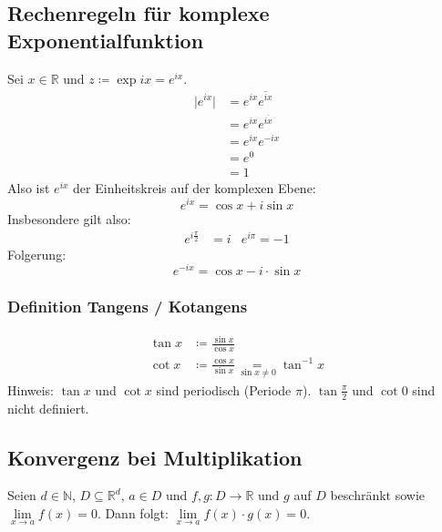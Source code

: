 \documentclass[halfparscip]{scrartcl}
\newcounter{subsection2}
\begin{document}
\subsection*{Rechenregeln für komplexe Exponentialfunktion}
Sei $x \in \mathbb{R}$ und $z \coloneqq \exp ix = e^{ix}$.
\begin{align*}
	\vert e^{ix}\vert & = e^{ix}\overline{e^{ix}} \\
	                  & = e^{ix}e^{\overline{ix}} \\
	                  & = e^{ix}e^{-ix}           \\
	                  & = e^0                     \\
	                  & = 1
\end{align*}
Also ist $e^{ix}$ der Einheitskreis auf der komplexen Ebene:
\begin{equation*}
	e^{ix} = \cos x + i \sin x
\end{equation*}
Insbesondere gilt also:
\begin{align*}
	e^{i\frac{\pi}{2}} &= i & e^{i\pi} = -1
\end{align*}
Folgerung:
\begin{equation*}
	e^{-ix} = \cos x - i \cdot \sin x
\end{equation*}

\subsubsection*{Definition Tangens / Kotangens}
\begin{align*}
	\tan x & \coloneqq \frac{\sin x}{\cos x}                                         \\
	\cot x & \coloneqq \frac{\cos x}{\sin x} \underset{\sin x \neq 0}{=} \tan^{-1} x
\end{align*}
Hinweis: $\tan x$ und $\cot x$ sind periodisch (Periode $\pi$). $\tan \frac{\pi}{2}$ und $\cot 0$ sind nicht definiert.

\subsection{Konvergenz bei Multiplikation}
Seien $d \in \mathbb{N}$, $D \subseteq \mathbb{R}^d$, $a \in D$ und $f,g : D \rightarrow \mathbb{R}$ und $g$ auf $D$ beschränkt sowie \mbox{$\lim\limits_{x \rightarrow a} f(x) = 0$}.
Dann folgt: $\lim\limits_{x \rightarrow a} f(x) \cdot g(x) = 0$.
\end{document}
